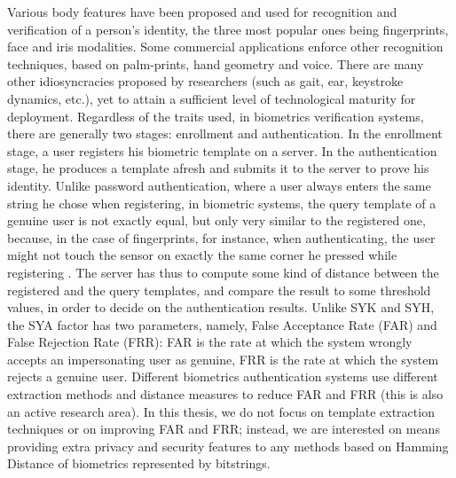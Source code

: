 Various body features have been proposed and used for recognition and
verification of a person's identity, the three most popular ones being fingerprints, face and
iris modalities. Some commercial applications enforce other recognition techniques, based on palm-prints, hand geometry and voice. There are many other idiosyncracies proposed by
researchers (such as gait, ear, keystroke dynamics, etc.), yet to attain a
sufficient level of technological maturity for deployment. Regardless of the
traits used, in biometrics verification systems, there are generally two stages:
enrollment and authentication. In the enrollment stage, a user registers his
biometric template on a server. In the authentication stage, he produces
a template afresh and submits it to the server to prove his identity. Unlike password
authentication, where a user always enters the same string he chose when
registering, in biometric systems, the query template of a genuine user is not exactly equal, but only very similar to the registered one, because, in the case of fingerprints, for instance, when
authenticating, the user might not touch the sensor on exactly the same corner he pressed while registering . The server has thus to compute some kind of distance between the
registered and the query templates, and compare the result to some threshold
values, in order to decide on the authentication results. Unlike SYK and SYH, the SYA
factor has two parameters, namely, False Acceptance Rate (FAR) and False
Rejection Rate (FRR): FAR is the rate at which the system wrongly accepts an
impersonating user as genuine, FRR is the rate at which the system rejects a genuine
user. Different biometrics authentication systems use different extraction
methods and distance measures to reduce FAR and FRR (this is also an active
research area). In this thesis, we do not focus on template extraction techniques
or on improving FAR and FRR; instead, we are interested on means providing extra
privacy and security features to any methods based on Hamming Distance
of biometrics represented by bitstrings.

